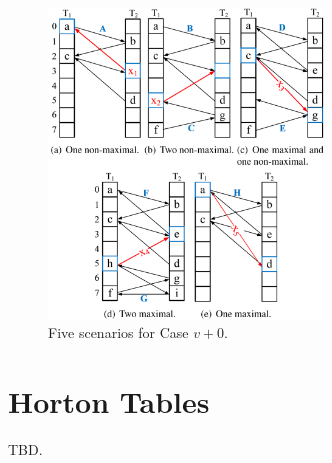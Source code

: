 \documentclass[runningheads]{llncs}
\begin{document}
\begin{figure}
    \centering
    \includegraphics[width=0.65\textwidth]{v+0.png}
    \caption{Five scenarios for Case $v+0$.} \label{fig:v+0}
\end{figure}

\section{Horton Tables}
\label{sec:horton}
TBD.
\end{document}
